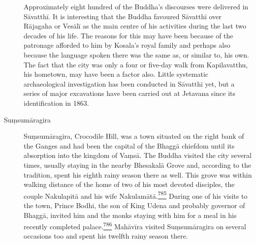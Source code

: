 \begin{description}
Approximately eight hundred of the Buddha's discourses were delivered in
Sāvatthī. It is interesting that the Buddha favoured Sāvatthī over
Rājagaha or Vesālī as the main centre of his activities during the last
two decades of his life. The reasons for this may have been because of
the patronage afforded to him by Kosala's royal family and perhaps also
because the language spoken there was the same as, or similar to, his
own. The fact that the city was only a four or five-day walk from
Kapilavatthu, his hometown, may have been a factor also. Little
systematic archaeological investigation has been conducted in Sāvatthī
yet, but a series of major excavations have been carried out at Jetavana
since its identification in 1863.
\item[Suṃsumāragira]
Suṃsumāragira, Crocodile Hill, was a town situated on the right bank of
the Ganges and had been the capital of the Bhaggā chiefdom until its
absorption into the kingdom of Vaṃsā. The Buddha visited the city
several times, usually staying in the nearby Bhesakalā Grove and,
according to the tradition, spent his eighth rainy season there as well.
This grove was within walking distance of the home of two of his most
devoted disciples, the couple Nakulapitā and his wife
Nakulamātā.\label{footprints_split_019.html_fnref785}\hyperref[footprints_split_025.htmlux5cux23fn785]{\textsuperscript{785}}
During one of his visits to the town, Prince Bodhi, the son of King
Udena and probably governor of Bhaggā, invited him and the monks staying
with him for a meal in his recently completed
palace.\label{footprints_split_019.html_fnref786}\hyperref[footprints_split_025.htmlux5cux23fn786]{\textsuperscript{786}}
Mahāvīra visited Suṃsumāragira on several occasions too and spent his
twelfth rainy season there.


\end{description}
